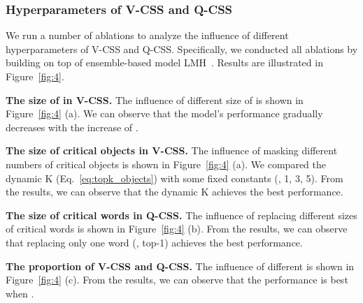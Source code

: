 \documentclass[10pt,twocolumn,letterpaper]{article}
\begin{document}
\subsubsection{Hyperparameters of V-CSS and Q-CSS}
We run a number of ablations to analyze the influence of different hyperparameters of V-CSS and Q-CSS. Specifically, we conducted all ablations by building on top of ensemble-based model LMH~\cite{clark2019don}. Results are illustrated in Figure~\ref{fig:4}.

\noindent\textbf{The size of  in V-CSS.} The influence of different size of  is shown in Figure~\ref{fig:4} (a). We can observe that the model's performance gradually decreases with the increase of . 

\noindent\textbf{The size of critical objects in V-CSS.} The influence of masking different numbers of critical objects is shown in Figure~\ref{fig:4} (a). We compared the dynamic K (Eq.~\eqref{eq:topk_objects}) with some fixed constants (\eg, 1, 3, 5). From the results, we can observe that the dynamic K achieves the best performance.

\noindent\textbf{The size of critical words in Q-CSS.} The influence of replacing different sizes of critical words is shown in Figure~\ref{fig:4} (b). From the results, we can observe that replacing only one word (\ie, top-1) achieves the best performance.

\noindent\textbf{The proportion  of V-CSS and Q-CSS.} The influence of different  is shown in Figure~\ref{fig:4} (c). From the results, we can observe that the performance is best when  .
\end{document}
